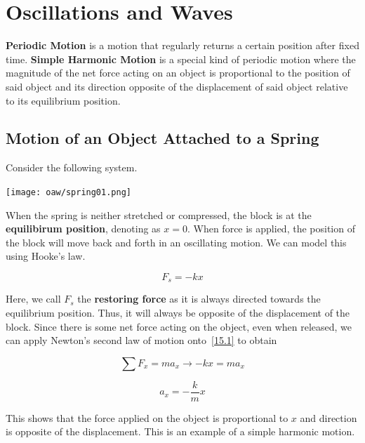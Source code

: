 \chapter{Oscillations and Waves}

\textbf{Periodic Motion} is a motion that regularly returns a certain position after fixed time.
\textbf{Simple Harmonic Motion} is a special kind of periodic motion where the magnitude of the 
net force acting on an object is proportional to the position of said object and its direction
opposite of the displacement of said object relative to its equilibrium position.

\section{Motion of an Object Attached to a Spring}

Consider the following system.

\begin{center}
\texttt{[image: oaw/spring01.png]}\label{fig15.1}
\end{center}

When the spring is neither stretched or compressed, the block is at the \textbf{equilibirum position},
denoting as $x = 0$. When force is applied, the position of the block will move back and forth in an 
oscillating motion. We can model this using Hooke's law.

\begin{equation}\label{15.1}
    F_s = -kx
\end{equation} 

Here, we call $F_s$ the \textbf{restoring force} as it is always directed towards the equilibrium position.
Thus, it will always be opposite of the displacement of the block. Since there is some net force
acting on the object, even when released, we can apply Newton's second law of motion onto~\eqref{15.1}
to obtain

\begin{equation*}
    \sum F_x = ma_x \rightarrow -kx = ma_x
\end{equation*}

\begin{equation}\label{15.2}
    a_x = - \frac{k}{m}x
\end{equation}

This shows that the force applied on the object is proportional to $x$ and direction is opposite 
of the displacement. This is an example of a simple harmonic motion.

